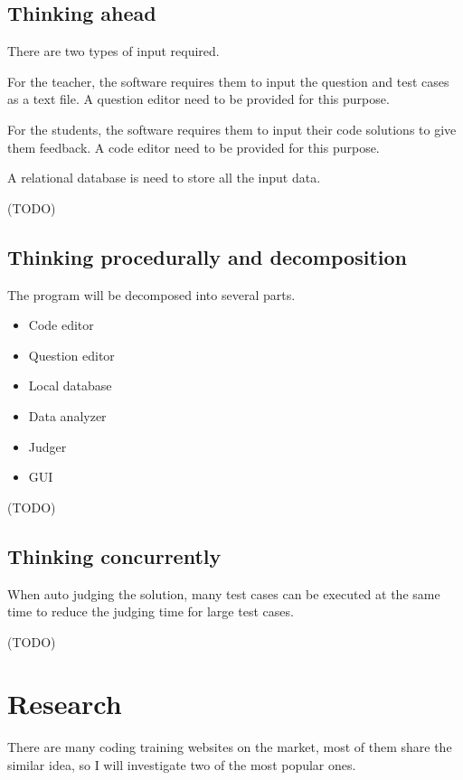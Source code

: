 \documentclass{report}
\begin{document}
\subsection{Thinking ahead}

There are two types of input required.

For the teacher, the software requires them to input the question and test cases as a text file. A question editor need to be provided for this purpose.

For the students, the software requires them to input their code solutions to give them feedback. A code editor need to be provided for this purpose.

A relational database is need to store all the input data.

(TODO)

\subsection{Thinking procedurally and decomposition}

The program will be decomposed into several parts.

\begin{itemize}
    \item Code editor
    \item Question editor
    \item Local database
    \item Data analyzer
    \item Judger
    \item GUI
\end{itemize}

(TODO)

\subsection{Thinking concurrently}

When auto judging the solution, many test cases can be executed at the same time to reduce the judging time for large test cases.

(TODO)

\section{Research}

There are many coding training websites on the market, most of them share the similar idea, so I will investigate two of the most popular ones.
\end{document}
